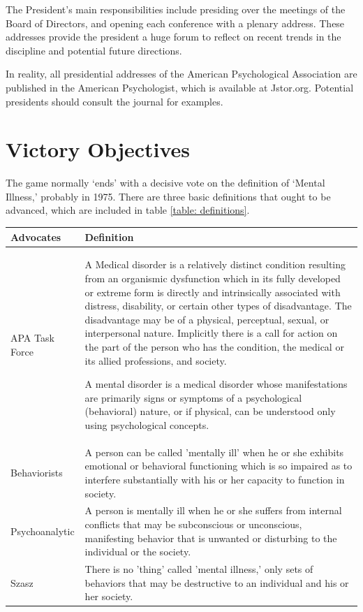 \begin{refsection}
The President's main responsibilities include presiding over the meetings of the Board of Directors, and opening each conference with a plenary address. These addresses provide the president a huge forum to reflect on recent trends in the discipline and potential future directions.

In reality, all presidential addresses of the American Psychological Association are published in the American Psychologist, which is available at Jstor.org. Potential presidents should consult the journal for examples.

\section{Victory Objectives}
\label{victoryobjectives}

The game normally `ends' with a decisive vote on the definition of `Mental Illness,' probably in 1975. There are three basic definitions that ought to be advanced, which are included in table \ref{table: definitions}.
 \begin{longtable}[!t]{ | p{2cm} | p{12cm} | }
\hline

\textbf{Advocates}&\textbf{Definition}\\ \hline
APA Task Force&A Medical disorder is a relatively distinct condition resulting from an organismic dysfunction which in its fully developed or extreme form is directly and intrinsically associated with distress, disability, or certain other types of disadvantage.  The disadvantage may be of a physical, perceptual, sexual, or interpersonal nature. Implicitly there is a call for action on the part of the person who has the condition, the medical or its allied professions, and society.

A mental disorder is a medical disorder whose manifestations are primarily signs or symptoms of a psychological (behavioral) nature, or if physical, can be understood only using psychological concepts.\\ \hline
Behaviorists& A person can be called 'mentally ill' when he or she exhibits emotional or behavioral functioning which is so impaired as to interfere substantially with his or her capacity to function in society. \\ \hline
Psychoanalytic&A person is mentally ill when he or she suffers from internal conflicts that may be subconscious or unconscious, manifesting behavior that is unwanted or disturbing to the individual or the society. \\ \hline
Szasz&There is no 'thing' called 'mental illness,' only  sets of behaviors that may be destructive to an individual and his or her society. \\ \hline
 

\end{longtable}
\end{refsection}

